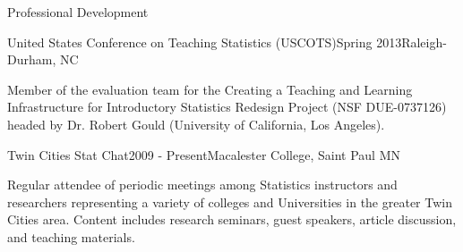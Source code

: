 \documentclass{resume} %
\begin{document}

\begin{rSection}{Professional Development}
	
	
	\begin{rSubsection}{United States Conference on Teaching Statistics (USCOTS)}{Spring 2013}{Raleigh-Durham, NC}{}
		\item[] Member of the evaluation team for the Creating a Teaching and Learning Infrastructure for Introductory Statistics Redesign Project (NSF DUE-0737126) headed by Dr. Robert Gould (University of California, Los Angeles). 
		
	\end{rSubsection}
	
	
	\begin{rSubsection}{Twin Cities Stat Chat}{2009 - Present}{Macalester College, Saint Paul MN}{}
		\item[] Regular attendee of periodic meetings among Statistics instructors and researchers representing a variety of colleges and Universities in the greater Twin Cities area.  Content includes research seminars, guest speakers, article discussion, and teaching materials.
		
		
	\end{rSubsection}
	

\end{rSection}
\end{document}
